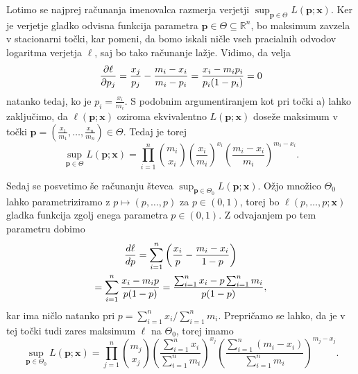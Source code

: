 \documentclass[a4paper,11pt]{article}
\newcommand{\sumin}{\sum_{i = 1}^n}
\newcommand{\R}{\mathbb{R}}
\begin{document}
Lotimo se najprej računanja imenovalca razmerja verjetji $\sup_{\bm{p} \in \Theta} L(\bm{p}; \bm{x})$. Ker je verjetje gladko odvisna funkcija parametra $\bm{p} \in \Theta \subseteq \R^n$, bo maksimum zavzela v stacionarni točki, kar pomeni, da bomo iskali ničle vseh pracialnih odvodov logaritma verjetja $\ell$, saj bo tako računanje lažje. Vidimo, da velja
\[
    \pdv{\ell}{p_j} (\bm{p}; \bm{x}) = 
    \frac{x_j}{p_j} - \frac{m_i - x_i}{m_i - p_i} = 
    \frac{x_i - m_i p_i}{p_i(1 - p_i)} = 0
\] 
natanko tedaj, ko je $p_i = \frac{x_i}{m_i}$. S podobnim argumentiranjem kot pri točki a) lahko zaključimo, da $\ell(\bm{p}; \bm{x})$ oziroma ekvivalentno $L(\bm{p}; \bm{x})$ doseže maksimum v točki $\bm{p} = (\frac{x_1}{m_1}, \dots, \frac{x_n}{m_n}) \in \Theta$. Tedaj je torej 
\[
    \sup_{\bm{p} \in \Theta} L(\bm{p}; \bm{x}) = 
    \prod_{i = 1}^n \binom{m_i}{x_i} \left(\frac{x_i}{m_i}\right)^{x_i} \left(\frac{m_i - x_i}{m_i}\right)^{m_i - x_i}.
\]

Sedaj se posvetimo še računanju števca $\sup_{\bm{p} \in \Theta_0} L(\bm{p}; \bm{x})$. Ožjo množico $\Theta_0$ lahko parametriziramo z $p \mapsto (p,\dots, p)$ za $p \in (0,1)$, torej bo $\ell(p, \dots, p; \bm{x})$ gladka funkcija zgolj enega parametra $p \in (0,1)$. Z odvajanjem po tem parametru dobimo 
\begin{multline*}
    \derivative{\ell}{p} (p, \dots, p; \bm{x}) = 
    \sumin \left(\frac{x_i}{p} - \frac{m_i - x_i}{1 - p}\right) \\ = 
    \sumin \frac{x_i - m_i p}{p(1-p)} = 
    \frac{\sumin x_i - p \sumin m_i}{p(1-p)},
\end{multline*}
kar ima ničlo natanko pri $p = \sumin x_i / \sumin m_i$. Prepričamo se lahko, da je v tej točki tudi zares maksimum $\ell$ na $\Theta_0$, torej imamo
\[
    \sup_{\bm{p} \in \Theta_0} L(\bm{p}; \bm{x}) = 
    \prod_{j = 1}^n \binom{m_j}{x_j} \left(\frac{\sumin x_i}{\sumin m_i}\right)^{x_j} \left(\frac{\sumin(m_i - x_i)}{\sumin m_i}\right)^{m_j - x_j}.
\]
\end{document}
